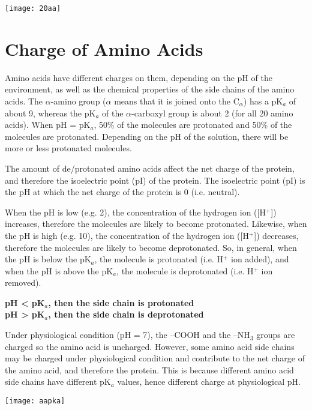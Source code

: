 \documentclass[a4paper, 12pt]{report}
\begin{document}
\texttt{[image: 20aa]}

\section{Charge of Amino Acids}

Amino acids have different charges on them, depending on the pH of the environment, as well as the chemical properties of the side chains of the amino acids.
The $\alpha$-amino group ($\alpha$ means that it is joined onto the C$_{\alpha}$) has a pK$_a$ of about 9, whereas the pK$_a$ of the $\alpha$-carboxyl group is about 2 (for all 20 amino acids).
When pH = pK$_a$, 50\% of the molecules are protonated and 50\% of the molecules are protonated.
Depending on the pH of the solution, there will be more or less protonated molecules.

The amount of de/protonated amino acids affect the net charge of the protein, and therefore the isoelectric point (pI) of the protein.
The isoelectric point (pI) is the pH at which the net charge of the protein is 0 (i.e. neutral).

When the pH is low (e.g. 2), the concentration of the hydrogen ion ([H$^+$]) increases, therefore the molecules are likely to become protonated.
Likewise, when the pH is high (e.g. 10), the concentration of the hydrogen ion ([H$^+$]) decreases, therefore the molecules are likely to become deprotonated.
So, in general, when the pH is below the pK$_a$, the molecule is protonated (i.e. H$^+$ ion added), and when the pH is above the pK$_a$, the molecule is deprotonated (i.e. H$^+$ ion removed).

\begin{center}
    \textbf
        {pH \textless{} pK$_a$, then the side chain is protonated \\
        pH \textgreater{} pK$_a$, then the side chain is deprotonated}
\end{center}

Under physiological condition (pH = 7), the --COOH and the --NH$_3$ groups are charged so the amino acid is uncharged.
However, some amino acid side chains may be charged under physiological condition and contribute to the net charge of the amino acid, and therefore the protein.
This is because different amino acid side chains have different pK$_a$ values, hence different charge at physiological pH.

\begin{center}
\texttt{[image: aapka]}
\end{center}
\end{document}
